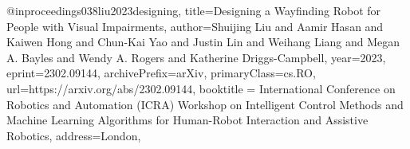 @inproceedings{038liu2023designing, 
title={Designing a Wayfinding Robot for People with Visual Impairments}, 
author={Shuijing Liu and Aamir Hasan and Kaiwen Hong and Chun-Kai Yao and Justin Lin and Weihang Liang and Megan A. Bayles and Wendy A. Rogers and Katherine Driggs-Campbell},
year={2023},
eprint={2302.09144},
archivePrefix={arXiv},
primaryClass={cs.RO},
url={https://arxiv.org/abs/2302.09144}, 
booktitle = {International Conference on Robotics and Automation (ICRA) Workshop on Intelligent Control Methods and Machine Learning Algorithms for Human-Robot Interaction and Assistive Robotics},
address={London},
}